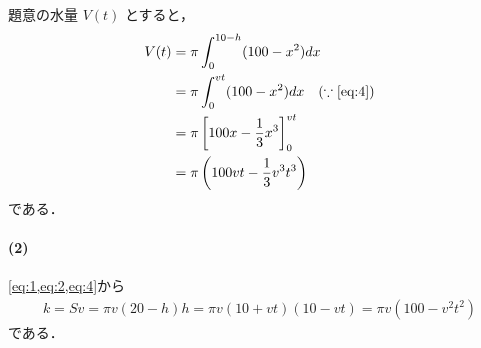 \documentclass[../../main.tex]{subfiles}
\begin{document}
題意の水量 $V(t)$ とすると，
\begin{align}
  V(t)
  &= \pi \int_0^{10-h} (100 - x^2) dx \\
  &= \pi \int_0^{vt} (100 - x^2) dx \quad (\because\text{\cref{eq:4}})\\
  &= \pi \left[ 100x - \dfrac{1}{3}x^3 \right]_0^{vt} \\
  &= \pi \left( 100vt - \dfrac{1}{3}v^3 t^3 \right)
\end{align}
である．

\paragraph{(2)}

\cref{eq:1,eq:2,eq:4}から
\begin{align}
  k = S v = \pi v (20-h) h = \pi v (10+vt)(10-vt) = \pi v (100 - v^2 t^2)
\end{align}
である．

\newpage
\end{document}
